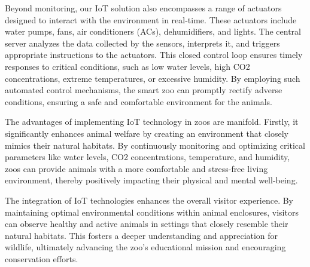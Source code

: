 \documentclass[parskip=full]{report}
\begin{document}
Beyond monitoring, our IoT solution also encompasses a range of actuators designed to interact with the environment in real-time. These actuators include water pumps, fans, air conditioners (ACs), dehumidifiers, and lights. The central server analyzes the data collected by the sensors, interprets it, and triggers appropriate instructions to the actuators. This closed control loop ensures timely responses to critical conditions, such as low water levels, high CO2 concentrations, extreme temperatures, or excessive humidity. By employing such automated control mechanisms, the smart zoo can promptly rectify adverse conditions, ensuring a safe and comfortable environment for the animals.

The advantages of implementing IoT technology in zoos are manifold. Firstly, it significantly enhances animal welfare by creating an environment that closely mimics their natural habitats. By continuously monitoring and optimizing critical parameters like water levels, CO2 concentrations, temperature, and humidity, zoos can provide animals with a more comfortable and stress-free living environment, thereby positively impacting their physical and mental well-being.


The integration of IoT technologies enhances the overall visitor experience. By maintaining optimal environmental conditions within animal enclosures, visitors can observe healthy and active animals in settings that closely resemble their natural habitats. This fosters a deeper understanding and appreciation for wildlife, ultimately advancing the zoo's educational mission and encouraging conservation efforts.

\end{document}
